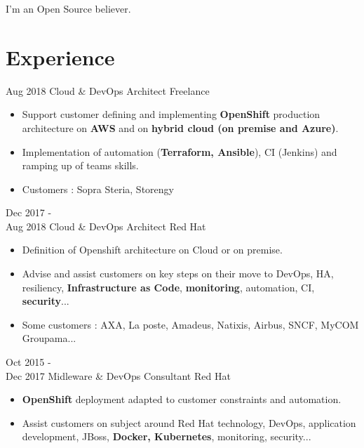 \documentclass[]{friggeri-cv}
\begin{document}
 \vspace{-4pt}
 \qquad  I'm an Open Source believer.  
\section{Experience}
\setlength{\parsepsave}{\parsep}%
\setlength{\parsep}{8.0pt}%
\begin{entrylist}	
	\entryDate
		{ Aug 2018 }
		{Cloud \& DevOps Architect}
		{Freelance}
		{	\vspace{-10pt}
			\begin{itemize}[wide]
			\item Support customer defining and implementing \textbf{OpenShift} production architecture on \textbf{AWS} and on \textbf{hybrid cloud (on premise and Azure)}.  
			\item Implementation of automation (\textbf{Terraform, Ansible}), CI (Jenkins) and ramping up of teams skills.  \
		 \item Customers : Sopra Steria, Storengy
		\end{itemize}
		}
	\entryDate
		{Dec 2017 - \\ Aug 2018 }
		{Cloud \& DevOps Architect}
		{Red Hat}
		{	\vspace{-10pt}
			\begin{itemize}[wide]
			\item Definition of Openshift architecture on Cloud or on premise. 
			\item Advise and assist customers on key steps on their move to DevOps, HA, resiliency, \textbf{Infrastructure as Code}, \textbf{monitoring}, automation, CI, \textbf{security}... 
			\item Some customers : AXA, La poste, Amadeus, Natixis, Airbus, SNCF, MyCOM Groupama...    
		\end{itemize}
		}
	\entryDate
		{Oct 2015 - \\ Dec 2017}
		{Midleware \& DevOps Consultant}
		{Red Hat}
		{	\vspace{-10pt}
			\begin{itemize}[wide]
			\item \textbf{OpenShift} deployment adapted to customer constraints and automation. 
			\item Assist customers on subject around Red Hat technology, DevOps, application development, JBoss, \textbf{Docker, Kubernetes}, monitoring, security... 

\end{itemize}}
\end{entrylist}
\end{document}
